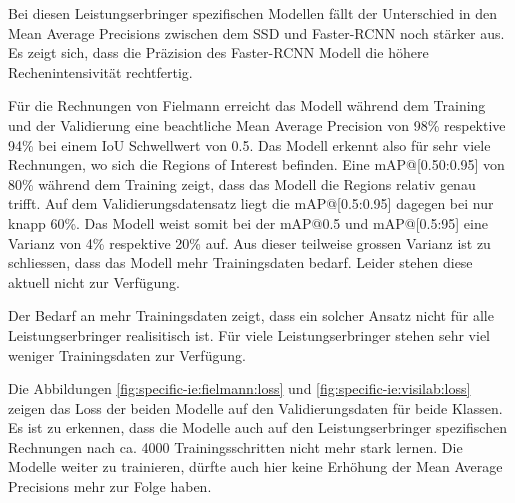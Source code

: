 Bei diesen Leistungserbringer spezifischen Modellen fällt der Unterschied in den Mean Average Precisions zwischen dem SSD und Faster-RCNN noch stärker aus. Es zeigt sich, dass die Präzision des Faster-RCNN Modell die höhere Rechenintensivität rechtfertig.

Für die Rechnungen von Fielmann erreicht das Modell während dem Training und der Validierung eine beachtliche Mean Average Precision von 98\% respektive 94\% bei einem IoU Schwellwert von 0.5. Das Modell erkennt also für sehr viele Rechnungen, wo sich die Regions of Interest befinden. Eine mAP@[0.50:0.95] von 80\% während dem Training zeigt, dass das Modell die Regions relativ genau trifft. Auf dem Validierungsdatensatz liegt die mAP@[0.5:0.95] dagegen bei nur knapp 60\%. Das Modell weist somit bei der mAP@0.5 und mAP@[0.5:95] eine Varianz von 4\% respektive 20\% auf. Aus dieser teilweise grossen Varianz ist zu schliessen, dass das Modell mehr Trainingsdaten bedarf. Leider stehen diese aktuell nicht zur Verfügung. 

Der Bedarf an mehr Trainingsdaten zeigt, dass ein solcher Ansatz nicht für alle Leistungserbringer realisitisch ist. Für viele Leistungserbringer stehen sehr viel weniger Trainingsdaten zur Verfügung.



Die Abbildungen \ref{fig:specific-ie:fielmann:loss} und  \ref{fig:specific-ie:visilab:loss} zeigen das Loss der beiden Modelle auf den Validierungsdaten für beide Klassen. Es ist zu erkennen, dass die Modelle auch auf den Leistungserbringer spezifischen Rechnungen nach ca. 4000 Trainingsschritten nicht mehr stark lernen. Die Modelle weiter zu trainieren, dürfte auch hier keine Erhöhung der Mean Average Precisions mehr zur Folge haben.

